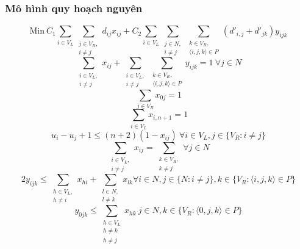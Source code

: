 \documentclass[a4paper,12pt]{report}
\begin{document}
\subsubsection{Mô hình quy hoạch nguyên} 
\begin{center}

\begin{equation} \label{eqn:1}
\text{Min}\  C_1 \sum_{i\in V_L} \sum_{\substack{j \in V_R,\\ i\neq j}}d_{ij}x_{ij}+C_2\sum_{i\in V_L} \sum_{\substack{j\in N,\\i \neq j }} \sum_{\substack{k \in V_R,\\ \langle i,j,k \rangle \in P}}(d'_{i,j}+d'_{jk})y_{ijk}  
\end{equation}
\begin{equation}\label{eqn:2}
 \sum_{\substack{i \in V_L, \\i \neq j}}x_{ij}+\sum_{\substack{i \in V_L,\\i \neq j}}\sum_{\substack{k \in V_R,\\\langle i,j,k \rangle \in P}}y_{ijk}=1 \ \forall j \in N
\end{equation}
\begin{equation}\label{eqn:3}
\sum_{j \in V_R} x_{0j}=1
\end{equation}
\begin{equation}\label{eqn:4}
\sum_{i \in V_L}x_{i,n+1}=1
\end{equation}
\begin{equation}\label{eqn:5}
u_i-u_j+1 \leq (n+2)(1-x_{ij}) \ \forall i \in V_L, j \in \{V_R:i \neq j\}
\end{equation}
\begin{equation}\label{eqn:6}
\sum_{\substack{i \in V_L, \\ i \neq j}} x_{ij}=\sum_{\substack{k \in V_R,\\k \neq j}} \forall j \in N
\end{equation}
\begin{equation}\label{eqn:7}
2y_{ijk} \leq \sum_{\substack{h \in V_L, \\ h \neq i}} x_{hi} +\sum_{\substack{ l \in N,\\ l \neq k}} x_{lk} \forall i \in N, j \in \{N:i \neq j\},k \in \{V_R:\langle i,j,k \rangle \in P\}
\end{equation}
\begin{equation}\label{eqn:8}
y_{0jk} \leq \sum_{\substack{h \in V_L \\ h \neq k\\ h \neq j}} x_{hk} \ j\in N,k \in \{V_R:\langle 0,j,k \rangle \in P\}

\end{equation}
\end{center}
\end{document}
